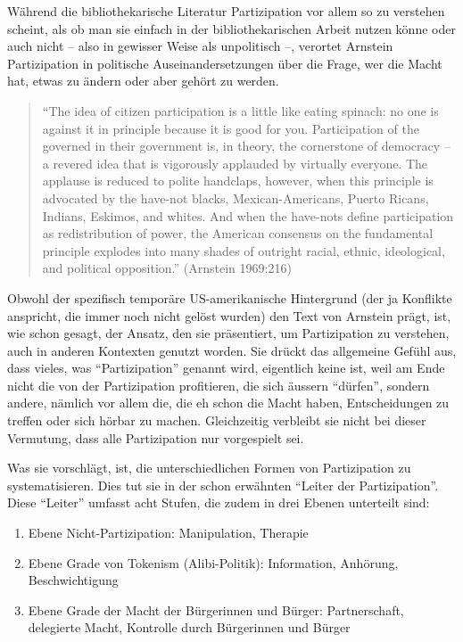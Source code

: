 \documentclass[a4paper,
fontsize=11pt,
oneside,
numbers=noperiodatend,
parskip=half-,
bibliography=totoc,
final
]{scrartcl}
\begin{document}
Während die bibliothekarische Literatur Partizipation vor allem so zu
verstehen scheint, als ob man sie einfach in der bibliothekarischen
Arbeit nutzen könne oder auch nicht -- also in gewisser Weise als
unpolitisch --, verortet Arnstein Partizipation in politische
Auseinandersetzungen über die Frage, wer die Macht hat, etwas zu ändern
oder aber gehört zu werden.

\begin{quote}
\enquote{The idea of citizen participation is a little like eating
spinach: no one is against it in principle because it is good for you.
Participation of the governed in their government is, in theory, the
cornerstone of democracy -- a revered idea that is vigorously applauded
by virtually everyone. The applause is reduced to polite handclaps,
however, when this principle is advocated by the have-not blacks,
Mexican-Americans, Puerto Ricans, Indians, Eskimos, and whites. And when
the have-nots define participation as redistribution of power, the
American consensus on the fundamental principle explodes into many
shades of outright racial, ethnic, ideological, and political
opposition.} (Arnstein 1969:216)
\end{quote}

Obwohl der spezifisch temporäre US-amerikanische Hintergrund (der ja
Konflikte anspricht, die immer noch nicht gelöst wurden) den Text von
Arnstein prägt, ist, wie schon gesagt, der Ansatz, den sie präsentiert,
um Partizipation zu verstehen, auch in anderen Kontexten genutzt worden.
Sie drückt das allgemeine Gefühl aus, dass vieles, was
\enquote{Partizipation} genannt wird, eigentlich keine ist, weil am Ende
nicht die von der Partizipation profitieren, die sich äussern
\enquote{dürfen}, sondern andere, nämlich vor allem die, die eh schon
die Macht haben, Entscheidungen zu treffen oder sich hörbar zu machen.
Gleichzeitig verbleibt sie nicht bei dieser Vermutung, dass alle
Partizipation nur vorgespielt sei.

Was sie vorschlägt, ist, die unterschiedlichen Formen von Partizipation
zu systematisieren. Dies tut sie in der schon erwähnten \enquote{Leiter
der Partizipation}. Diese \enquote{Leiter} umfasst acht Stufen, die
zudem in drei Ebenen unterteilt sind:

\begin{enumerate}
\def\labelenumi{\arabic{enumi}.}
\item
  Ebene Nicht-Partizipation: Manipulation, Therapie
\item
  Ebene Grade von Tokenism (Alibi-Politik): Information, Anhörung,
  Beschwichtigung
\item
  Ebene Grade der Macht der Bürgerinnen und Bürger: Partnerschaft,
  delegierte Macht, Kontrolle durch Bürgerinnen und Bürger
\end{enumerate}
\end{document}
